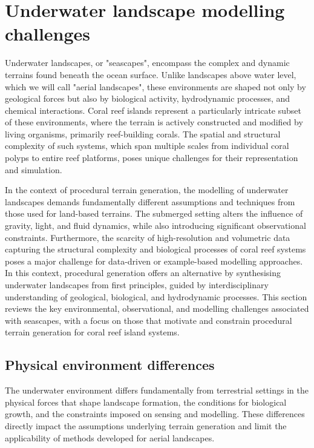 \section{Underwater landscape modelling challenges}
Underwater landscapes, or "seascapes", encompass the complex and dynamic terrains found beneath the ocean surface. Unlike landscapes above water level, which we will call "aerial landscapes", these environments are shaped not only by geological forces but also by biological activity, hydrodynamic processes, and chemical interactions. Coral reef islands represent a particularly intricate subset of these environments, where the terrain is actively constructed and modified by living organisms, primarily reef-building corals. The spatial and structural complexity of such systems, which span multiple scales from individual coral polyps to entire reef platforms, poses unique challenges for their representation and simulation.

In the context of procedural terrain generation, the modelling of underwater landscapes demands fundamentally different assumptions and techniques from those used for land-based terrains. The submerged setting alters the influence of gravity, light, and fluid dynamics, while also introducing significant observational constraints. Furthermore, the scarcity of high-resolution and volumetric data capturing the structural complexity and biological processes of coral reef systems poses a major challenge for data-driven or example-based modelling approaches. In this context, procedural generation offers an alternative by synthesising underwater landscapes from first principles, guided by interdisciplinary understanding of geological, biological, and hydrodynamic processes. This section reviews the key environmental, observational, and modelling challenges associated with seascapes, with a focus on those that motivate and constrain procedural terrain generation for coral reef island systems.

\subsection{Physical environment differences}
The underwater environment differs fundamentally from terrestrial settings in the physical forces that shape landscape formation, the conditions for biological growth, and the constraints imposed on sensing and modelling. These differences directly impact the assumptions underlying terrain generation and limit the applicability of methods developed for aerial landscapes.

